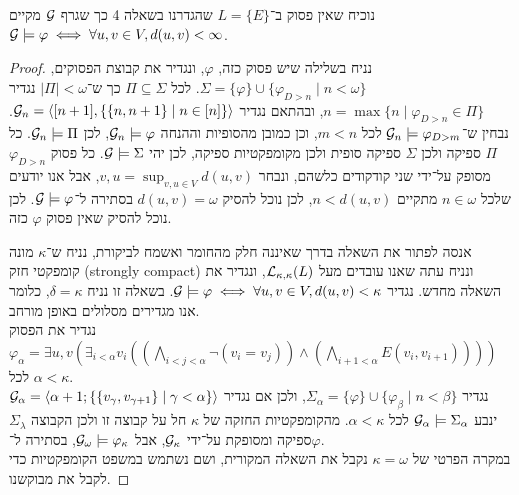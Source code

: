 \question{}
נוכיח שאין פסוק ב־$L = \{ E \}$ שהגדרנו בשאלה 4 כך שגרף $\mathcal{G}$ מקיים $\mathcal{G} \models \varphi \iff \forall u, v \in V, d(u, v) < \infty$.
\begin{proof}
	נניח בשלילה שיש פסוק כזה, $\varphi$, ונגדיר את קבוצת הפסוקים, $\Sigma = \{ \varphi \} \cup \{ \varphi_{D > n} \mid n < \omega \}$.
	לכל $\Pi \subseteq \Sigma$ כך ש־$|\Pi| < \omega$ נגדיר $n = \max\{ n \mid \varphi_{D > n} \in \Pi \}$, ובהתאם נגדיר $\mathcal{G}_n = \langle [n + 1], \{ \{n, n + 1\} \mid n \in [n] \}\rangle$.
	נבחין ש־$\mathcal{G}_n \models \varphi_{D > m}$ לכל $m < n$, וכן כמובן מהסופיות וההנחה $\mathcal{G}_n \models \varphi$, לכן $\mathcal{G}_n \models \Pi$.
	כל $\Pi$ ספיקה ולכן $\Sigma$ ספיקה סופית ולכן מקומפקטיות ספיקה, לכן יהי $\mathcal{G} \models \Sigma$.
	כל פסוק $\varphi_{D > n}$ מסופק על־ידי שני קודקודים כלשהם, ונבחר $v, u = \sup_{v, u \in V} d(u, v)$, אבל אנו יודעים שלכל $n \in \omega$ מתקיים $n < d(u, v)$, לכן נוכל להסיק $d(u, v) = \omega$ בסתירה ל־$\mathcal{G} \models \varphi$.
	לכן נוכל להסיק שאין פסוק $\varphi$ כזה.

	אנסה לפתור את השאלה בדרך שאיננה חלק מהחומר ואשמח לביקורת,
	נניח ש־$\kappa$ מונה קומפקטי חזק (strongly compact) ונניח עתה שאנו עובדים מעל $\mathcal{L}_{\kappa, \kappa}(L)$, ונגדיר את השאלה מחדש.
	נגדיר $\mathcal{G} \models \varphi \iff \forall u, v \in V, d(u, v) < \kappa$.
	בשאלה זו נניח $\delta = \kappa$, כלומר אנו מגדירים מסלולים באופן מורחב. \\
	נגדיר את הפסוק $\varphi_\alpha = \exists u, v (\exists_{i < \alpha} v_i ((\bigwedge_{i < j < \alpha} \lnot (v_i = v_j)) \land (\bigwedge_{i + 1 < \alpha} E(v_i, v_{i + 1}))))$ לכל $\alpha < \kappa$. \\
	נגדיר $\Sigma_\alpha = \{ \varphi \} \cup \{ \varphi_\beta \mid n < \beta \}$,
	ולכן אם נגדיר $\mathcal{G}_\alpha = \langle \alpha + 1; \{ \{ v_\gamma, v_{\gamma + 1} \} \mid \gamma < \alpha \} \rangle$ ינבע $\mathcal{G}_\alpha \models \Sigma_\alpha$ לכל $\alpha < \kappa$.
	מהקומפקטיות החזקה של $\kappa$ חל על קבוצה זו ולכן הקבוצה $\Sigma_\lambda$ ספיקה ומסופקת על־ידי $\mathcal{G}_\kappa$, אבל $\mathcal{G}_\omega \models \varphi_\kappa$, בסתירה ל־$\varphi$. \\
	במקרה הפרטי של $\kappa = \omega$ נקבל את השאלה המקורית, ושם נשתמש במשפט הקומפקטיות כדי לקבל את מבוקשנו.
\end{proof}


